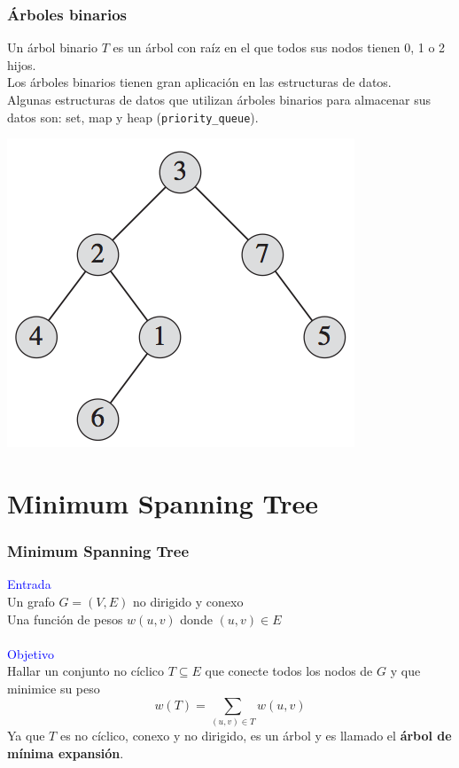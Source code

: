 \documentclass{beamer}
\begin{document}
	\begin{frame}[fragile]
		\frametitle{Árboles binarios}
		Un árbol binario $T$ es un árbol con raíz en el que todos sus nodos tienen 0, 1 o 2 hijos.\\
		Los árboles binarios tienen gran aplicación en las estructuras de datos.\\
		Algunas estructuras de datos que utilizan árboles binarios para almacenar sus datos son: set, map y heap (\verb|priority_queue|).
		\begin{center} \includegraphics[height = 0.4\textheight]{BinaryTree.png}  \end{center}
	\end{frame}


\section[MST]{Minimum Spanning Tree}
	\begin{frame}
		\frametitle{Minimum Spanning Tree}
		\textcolor{blue}{\large Entrada}\\
		Un grafo $G = (V, E)$ no dirigido y conexo\\ 
		Una función de pesos $w(u, v)$ donde $(u, v) \in E$ \\ \quad \\
		\textcolor{blue}{\large Objetivo}\\
		Hallar un conjunto no cíclico $T \subseteq E$ que conecte todos los nodos de $G$ y que minimice su peso
		$$w(T) = \sum_{(u, v) \in T}{w(u, v)}$$
		Ya que $T$ es no cíclico, conexo y no dirigido, es un árbol y es llamado el \textbf{árbol de mínima expansión}.
	\end{frame}
		
\end{document}

